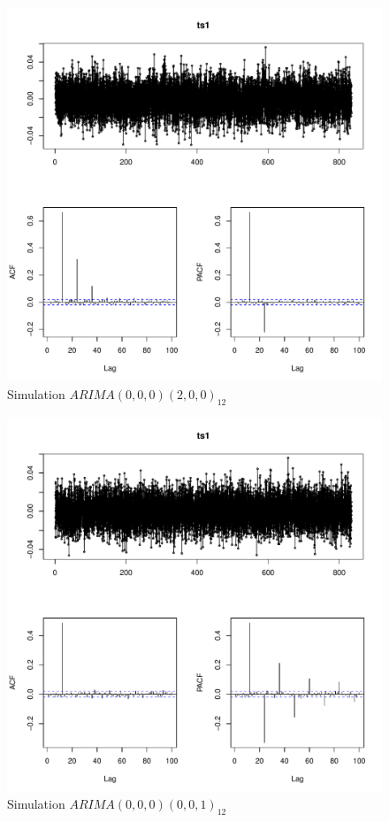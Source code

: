 \documentclass[a4paper,11pt,oneside,onecolumn]{book}
\begin{document}
\begin{figure}[!h]
\begin{center}
\includegraphics[width=.7\linewidth]{ SARP2.pdf}
\caption{Simulation $ARIMA(0,0,0)(2,0,0)_{12}$}\label{fig:sarima:P2}
\end{center}
\end{figure}

\begin{figure}[!h]
\begin{center}
\includegraphics[width=.7\linewidth]{ SMAQ1.pdf}
\caption{Simulation $ARIMA(0,0,0)(0,0,1)_{12}$}\label{fig:sarima:Q1}
\end{center}
\end{figure}
\end{document}
